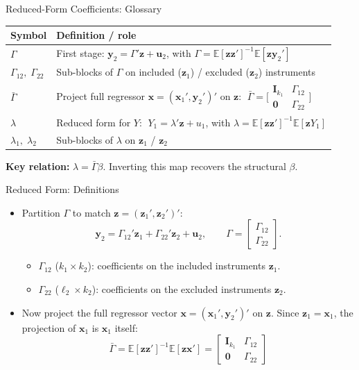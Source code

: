 \documentclass[aspectratio=169, handout]{beamer}
\numberwithin{equation}{section}
\begin{document}
\begin{frame}{Reduced-Form Coefficients: Glossary}
\small
\begin{center}
\renewcommand{\arraystretch}{1.35}
\begin{tabular}{ll}
\toprule
\textbf{Symbol} & \textbf{Definition / role}\\
\midrule
$\Gamma$ & First stage: $\bm{y}_2 = \Gamma'\bm{z}+\bm{u}_2$, with $\Gamma = \mathbb{E}[\bm{z}\bm{z}']^{-1}\mathbb{E}[\bm{z}\bm{y}_2']$\\
$\Gamma_{12},\;\Gamma_{22}$ & Sub-blocks of $\Gamma$ on included ($\bm{z}_1$) / excluded ($\bm{z}_2$) instruments\\
$\bar{\Gamma}$ & Project full regressor $\bm{x}=(\bm{x}_1',\bm{y}_2')'$ on $\bm{z}$: $\;\bar{\Gamma}=\bigl[\begin{smallmatrix}\bm{I}_{k_1}&\Gamma_{12}\\ \bm{0}&\Gamma_{22}\end{smallmatrix}\bigr]$\\
$\lambda$ & Reduced form for $Y$: $\;Y_1 = \lambda'\bm{z}+u_1$, with $\lambda = \mathbb{E}[\bm{z}\bm{z}']^{-1}\mathbb{E}[\bm{z}Y_1]$\\
$\lambda_1,\;\lambda_2$ & Sub-blocks of $\lambda$ on $\bm{z}_1$ / $\bm{z}_2$\\
\bottomrule
\end{tabular}
\end{center}
\vspace{0.3cm}
\textbf{Key relation:} $\lambda = \bar{\Gamma}\beta$. Inverting this map recovers the structural $\beta$.
\end{frame}


\begin{frame}{Reduced Form: Definitions}
\begin{itemize}
\item Partition $\Gamma$ to match $\bm{z}=(\bm{z}_1', \bm{z}_2')'$:
$$\bm{y}_2 = \Gamma_{12}'\bm{z}_1+\Gamma_{22}'\bm{z}_2+\bm{u}_2, \qquad \Gamma = \begin{bmatrix}\Gamma_{12}\\ \Gamma_{22}\end{bmatrix}.$$
\begin{itemize}
\item $\Gamma_{12}$ ($k_1\times k_2$): coefficients on the included instruments $\bm{z}_1$.
\item $\Gamma_{22}$ ($\ell_2\times k_2$): coefficients on the excluded instruments $\bm{z}_2$.
\end{itemize}
\item Now project the full regressor vector $\bm{x}=(\bm{x}_1', \bm{y}_2')'$ on $\bm{z}$. Since $\bm{z}_1=\bm{x}_1$, the projection of $\bm{x}_1$ is $\bm{x}_1$ itself:
$$\bar{\Gamma} = \mathbb{E}[\bm{z}\bm{z}']^{-1}\mathbb{E}[\bm{z}\bm{x}'] = \begin{bmatrix} \bm{I}_{k_1} & \Gamma_{12}\\ \bm{0} & \Gamma_{22}\end{bmatrix}$$
\end{itemize}
\end{frame}
\end{document}
